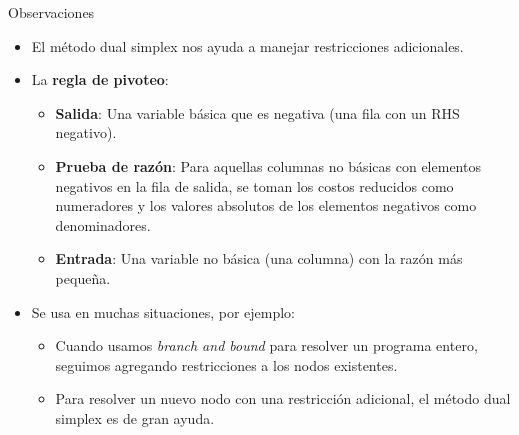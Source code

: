\documentclass{beamer}
\begin{document}
\begin{frame}{Observaciones}
    \begin{itemize}
        \item El método dual simplex nos ayuda a manejar restricciones adicionales.
        \item La \textbf{regla de pivoteo}:
        \begin{itemize}
            \item \textbf{Salida}: Una variable básica que es negativa (una fila con un RHS negativo).
            \item \textbf{Prueba de razón}: Para aquellas columnas no básicas con elementos negativos en la fila de salida, se toman los costos reducidos como numeradores y los valores absolutos de los elementos negativos como denominadores.
            \item \textbf{Entrada}: Una variable no básica (una columna) con la razón más pequeña.
        \end{itemize}

        \item Se usa en muchas situaciones, por ejemplo:
        \begin{itemize}
            \item Cuando usamos \textit{branch and bound} para resolver un programa entero, seguimos agregando restricciones a los nodos existentes.
            \item Para resolver un nuevo nodo con una restricción adicional, el método dual simplex es de gran ayuda.
        \end{itemize}
    \end{itemize}
\end{frame}
\end{document}
